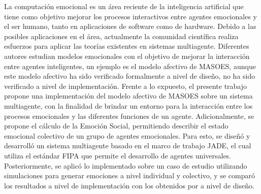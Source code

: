 %
%
%

La computación emocional es un área reciente de la inteligencia artificial que
tiene como objetivo mejorar los procesos interactivos entre agentes emocionales
y el ser humano, tanto en aplicaciones de software como de hardware. Debido a las
posibles aplicaciones en el área, actualmente la comunidad científica realiza
esfuerzos para aplicar las teorías existentes en sistemas multiagente.
Diferentes autores estudian modelos emocionales con el
objetivo de mejorar la interacción entre agentes inteligentes, un ejemplo es el modelo
afectivo de MASOES, aunque este modelo afectivo ha sido verificado formalmente
a nivel de diseño, no ha sido verificado a nivel de implementación.
Frente a lo expuesto, el presente trabajo propone una implementación del modelo afectivo de MASOES
sobre un sistema multiagente, con la finalidad de brindar un
entorno para la interacción entre los procesos emocionales y las diferentes
funciones de un agente. Adicionalmente, se propone el cálculo
de la Emoción Social, permitiendo
describir el estado emocional colectivo de un grupo de agentes emocionales. Para esto,
se diseñó y desarrolló un sistema multiagente basado en el marco de trabajo JADE,
el cual utiliza el estándar FIPA que permite el desarrollo de agentes universales.
Posteriormente, se aplicó lo implementado sobre un caso de estudio utilizando simulaciones
para generar emociones a nivel individual y colectivo, y se comparó los resultados a
nivel de implementación con los obtenidos por \cite{perozo2011} a nivel de
diseño.
